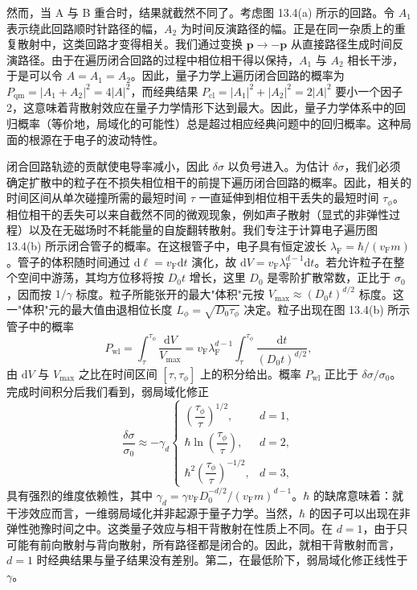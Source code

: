 然而，当 A 与 B 重合时，结果就截然不同了。考虑图 13.4(a) 所示的回路。令 $A_{1}$ 表示绕此回路顺时针路径的幅，$A_{2}$ 为时间反演路径的幅。正是在同一杂质上的重复散射中，这类回路才变得相关。我们通过变换 $\mathbf{p}\to-\mathbf{p}$ 从直接路径生成时间反演路径。由于在遍历闭合回路的过程中相位相干得以保持，$A_{1}$ 与 $A_{2}$ 相长干涉，于是可以令 $A=A_{1}=A_{2}$。因此，量子力学上遍历闭合回路的概率为 $P_{\mathrm{qm}}=|A_{1}+A_{2}|^{2}=4|A|^{2}$，而经典结果 $P_{\mathrm{cl}}=|A_{1}|^{2}+|A_{2}|^{2}=2|A|^{2}$ 要小一个因子 2，这意味着背散射效应在量子力学情形下达到最大。因此，量子力学体系中的回归概率（等价地，局域化的可能性）总是超过相应经典问题中的回归概率。这种局面的根源在于电子的波动特性。

闭合回路轨迹的贡献使电导率减小，因此 $\delta\sigma$ 以负号进入。为估计 $\delta\sigma$，我们必须确定扩散中的粒子在不损失相位相干的前提下遍历闭合回路的概率。因此，相关的时间区间从单次碰撞所需的最短时间 $\tau$ 一直延伸到相位相干丢失的最短时间 $\tau_{\phi}$。相位相干的丢失可以来自截然不同的微观现象，例如声子散射（显式的非弹性过程）以及在无磁场时不耗能量的自旋翻转散射。我们专注于计算电子遍历图 13.4(b) 所示闭合管子的概率。在这根管子中，电子具有恒定波长 $\lambda_{\mathrm{F}}=\hbar/(v_{\mathrm{F}}m)$。管子的体积随时间通过 $\mathrm{d}\ell=v_{\mathrm{F}}\mathrm{d}t$ 演化，故 $\mathrm{d}V=v_{\mathrm{F}}\lambda_{\mathrm{F}}^{d-1}\mathrm{d}t$。若允许粒子在整个空间中游荡，其均方位移将按 $D_{0}t$ 增长，这里 $D_{0}$ 是零阶扩散常数，正比于 $\sigma_{0}$，因而按 $1/\gamma$ 标度。粒子所能张开的最大"体积"元按 $V_{\mathrm{max}}\approx(D_{0}t)^{d/2}$ 标度。这一"体积"元的最大值由退相位长度 $L_{\phi}=\sqrt{D_{0}\tau_{\phi}}$ 决定。粒子出现在图 13.4(b) 所示管子中的概率
\begin{equation*}
P_{\mathrm{wl}}=\int_{\tau}^{\tau_{\phi}}\frac{\mathrm{d}V}{V_{\mathrm{max}}}=v_{\mathrm{F}}\lambda_{\mathrm{F}}^{d-1}\int_{\tau}^{\tau_{\phi}}\frac{\mathrm{d}t}{(D_{0}t)^{d/2}},\tag{13.16}
\end{equation*}
由 $\mathrm{d}V$ 与 $V_{\mathrm{max}}$ 之比在时间区间 $[\tau,\tau_{\phi}]$ 上的积分给出。概率 $P_{\mathrm{wl}}$ 正比于 $\delta\sigma/\sigma_{0}$。完成时间积分后我们看到，弱局域化修正
\begin{equation*}
\frac{\delta\sigma}{\sigma_{0}}\approx-\gamma_{d}
\begin{cases}
\left(\dfrac{\tau_{\phi}}{\tau}\right)^{1/2}, & d=1,\\[8pt]
\hbar\ln\left(\dfrac{\tau_{\phi}}{\tau}\right), & d=2,\\[8pt]
\hbar^{2}\left(\dfrac{\tau_{\phi}}{\tau}\right)^{-1/2}, & d=3,
\end{cases}\tag{13.17}
\end{equation*}
具有强烈的维度依赖性，其中 $\gamma_{d}=\gamma v_{\mathrm{F}}D_{0}^{-d/2}/(v_{\mathrm{F}}m)^{d-1}$。$\hbar$ 的缺席意味着：就干涉效应而言，一维弱局域化并非起源于量子力学。当然，$\hbar$ 的因子可以出现在非弹性弛豫时间之中。这类量子效应与相干背散射在性质上不同。在 $d=1$，由于只可能有前向散射与背向散射，所有路径都是闭合的。因此，就相干背散射而言，$d=1$ 时经典结果与量子结果没有差别。第二，在最低阶下，弱局域化修正线性于 $\gamma$。


